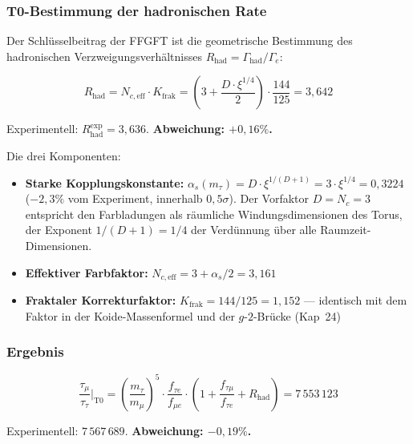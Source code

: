 	\subsubsection*{T0-Bestimmung der hadronischen Rate}
	
	Der Schlüsselbeitrag der FFGFT ist die geometrische Bestimmung des hadronischen Verzweigungsverhältnisses \(R_\text{had} = \Gamma_\text{had}/\Gamma_e\):
	
	\begin{equation}
		\boxed{R_\text{had} = N_{c,\text{eff}} \cdot K_\text{frak} = \left(3 + \frac{D \cdot \xi^{1/4}}{2}\right) \cdot \frac{144}{125} = 3{,}642}
	\end{equation}
	
	Experimentell: \(R_\text{had}^\text{exp} = 3{,}636\). \textbf{Abweichung: \(+0{,}16\%\).}
	
	Die drei Komponenten:
	
	\begin{itemize}
		\item \textbf{Starke Kopplungskonstante:} \(\alpha_s(m_\tau) = D \cdot \xi^{1/(D+1)} = 3 \cdot \xi^{1/4} = 0{,}3224\) (\(-2{,}3\%\) vom Experiment, innerhalb \(0{,}5\sigma\)). Der Vorfaktor \(D = N_c = 3\) entspricht den Farbladungen als räumliche Windungsdimensionen des Torus, der Exponent \(1/(D+1) = 1/4\) der Verdünnung über alle Raumzeit-Dimensionen.
		\item \textbf{Effektiver Farbfaktor:} \(N_{c,\text{eff}} = 3 + \alpha_s/2 = 3{,}161\)
		\item \textbf{Fraktaler Korrekturfaktor:} \(K_\text{frak} = 144/125 = 1{,}152\) — identisch mit dem Faktor in der Koide-Massenformel und der \(g\)-\(2\)-Brücke (Kap~24)
	\end{itemize}
	
	\subsubsection*{Ergebnis}
	
	\begin{equation}
		\frac{\tau_\mu}{\tau_\tau}\bigg|_\text{T0} = \left(\frac{m_\tau}{m_\mu}\right)^5 \cdot \frac{f_{\tau e}}{f_{\mu e}} \cdot \left(1 + \frac{f_{\tau\mu}}{f_{\tau e}} + R_\text{had}\right) = 7\,553\,123
	\end{equation}
	
	Experimentell: \(7\,567\,689\). \textbf{Abweichung: \(-0{,}19\%\).}
	
